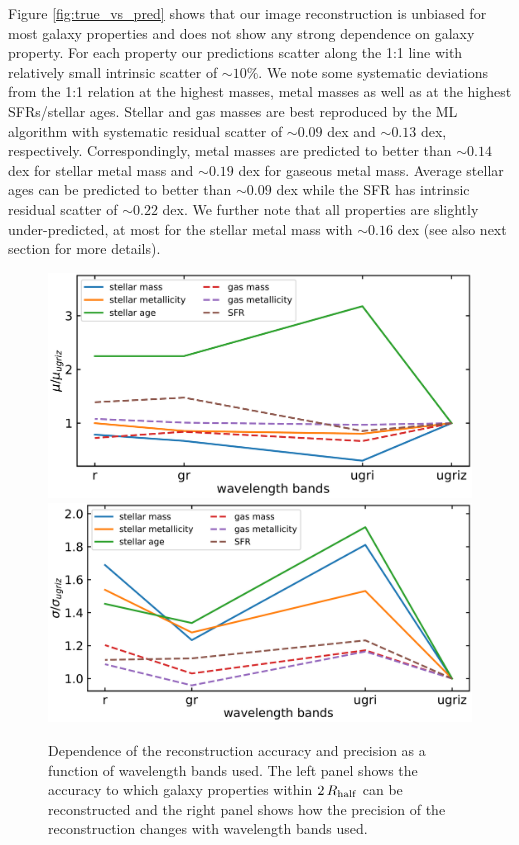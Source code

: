 \documentclass[conference]{IEEEtran}
\begin{document}
Figure \ref{fig:true_vs_pred} shows that our image reconstruction is unbiased for most galaxy properties and does not show any strong dependence on galaxy property. For each property our predictions scatter along the 1:1 line with relatively small intrinsic scatter of $\sim 10\%$. We note some systematic deviations from the 1:1 relation at the highest masses, metal masses as well as at the highest SFRs/stellar ages. Stellar and gas masses are best reproduced by the ML algorithm with systematic residual scatter of $\sim0.09$ dex and $\sim0.13$ dex, respectively. Correspondingly, metal masses are predicted to better than $\sim0.14$ dex for stellar metal mass and $\sim0.19$ dex for gaseous metal mass. Average stellar ages can be predicted to better than $\sim0.09$ dex while the SFR has intrinsic residual scatter of $\sim0.22$ dex. We further note that all properties are slightly under-predicted, at most for the stellar metal mass with $\sim0.16$ dex (see also next section for more details).

\begin{figure}
\begin{center}
\includegraphics[width=.485\textwidth]{./plots/band_comparison_mu.pdf}
\includegraphics[width=.5\textwidth]{./plots/band_comparison_sigma.pdf}
\end{center}
\vspace{-.35cm}
\caption{Dependence of the reconstruction accuracy and precision as a function of wavelength bands used. The left panel shows the accuracy to which galaxy properties within $2\,R_{\rm half}$ can be reconstructed and the right panel shows how the precision of the reconstruction changes with wavelength bands used.}
\label{fig:band_comp}
\end{figure}
\end{document}
